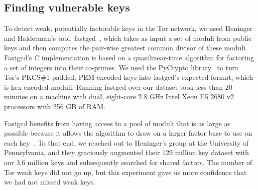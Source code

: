 \subsection{Finding vulnerable keys}
\label{sec:vulnerable-keys}
To detect weak, potentially factorable keys in the Tor network, we used Heninger
and Halderman's tool, fastgcd~\cite{fastgcd}, which takes as input a set
of moduli from public keys and then computes the pair-wise greatest common
divisor of these moduli.  Fastgcd's C implementation is based on a
quasilinear-time algorithm for factoring a set of integers into their co-primes.
We used the PyCrypto library~\cite{pycrypto} to turn Tor's PKCS\#1-padded,
PEM-encoded keys into fastgcd's expected format, which is hex-encoded
moduli.  Running fastgcd over our dataset took less than 20 minutes on
a machine with dual, eight-core 2.8 GHz Intel Xeon E5 2680 v2 processors with
256 GB of RAM.

Fastgcd benefits from having access to a pool of moduli that is as large as possible
because it allows the algorithm to draw on a larger factor base to use on each
key~\cite{Heninger2012a}.  To that end, we reached out to Heninger's group at
the University of Pennsylvania, and they graciously augmented their 129 million
key dataset with our 3.6 million keys and subsequently searched for shared
factors.  The number of Tor weak keys did not go up, but this experiment gave us
more confidence that we had not missed weak keys.
